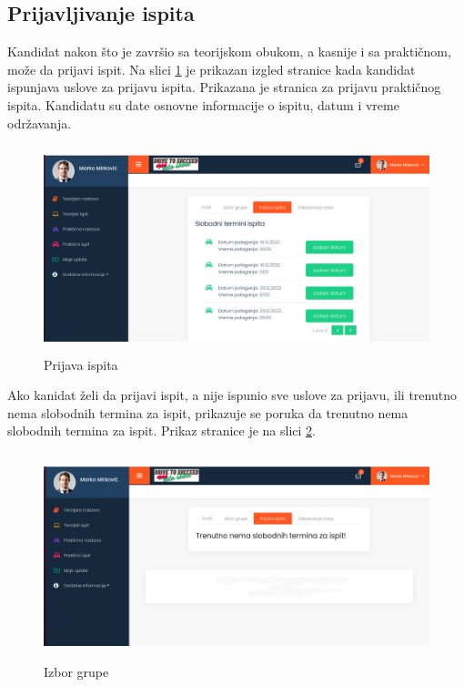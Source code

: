 \subsection{Prijavljivanje ispita}

Kandidat nakon što je završio sa teorijskom obukom, a kasnije i sa praktičnom, može da prijavi ispit. 
Na slici \ref{fig:ui_prijava_uspesna} je prikazan izgled stranice kada kandidat ispunjava uslove za prijavu ispita. 
Prikazana je stranica za prijavu praktičnog ispita. Kandidatu su date osnovne informacije o ispitu, datum i vreme održavanja.

\begin{figure}[H]
  \begin{center}
      \includegraphics[width=140mm, height=60mm]{UI/UI_prijava_ispita.png}
  \end{center}
  \caption {Prijava ispita}
  \label{fig:ui_prijava_uspesna}

\end{figure}


Ako kanidat želi da prijavi ispit, a nije ispunio sve uslove za prijavu, ili trenutno nema slobodnih termina za ispit, prikazuje se poruka da trenutno nema 
slobodnih termina za ispit. Prikaz stranice je na slici \ref{fig:ui_prijava2}.

\begin{figure}[H]
  \begin{center}
      \includegraphics[width=140mm, height=60mm]{UI/UI_prijava_ispita2.png}
  \end{center}
  \caption {Izbor grupe}
  \label{fig:ui_prijava2}

\end{figure}
